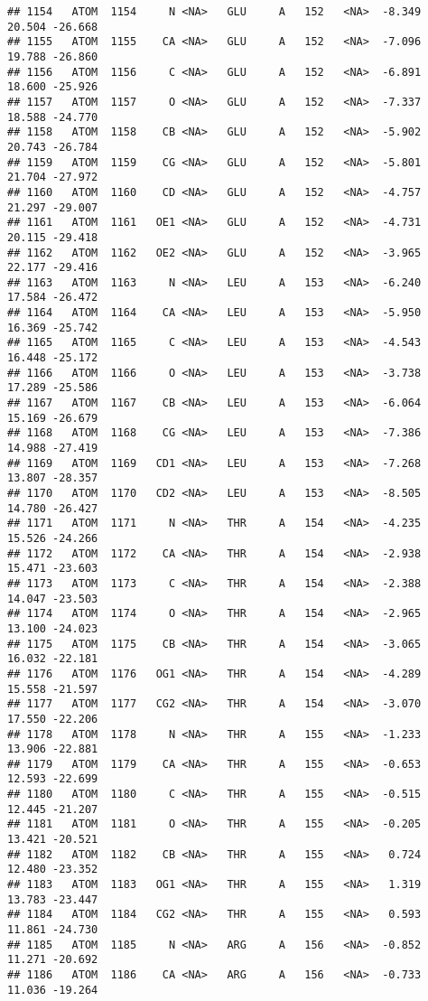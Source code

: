 \documentclass[
]{article}
\begin{document}
\begin{verbatim}
## 1154   ATOM  1154     N <NA>   GLU     A   152   <NA>  -8.349  20.504 -26.668
## 1155   ATOM  1155    CA <NA>   GLU     A   152   <NA>  -7.096  19.788 -26.860
## 1156   ATOM  1156     C <NA>   GLU     A   152   <NA>  -6.891  18.600 -25.926
## 1157   ATOM  1157     O <NA>   GLU     A   152   <NA>  -7.337  18.588 -24.770
## 1158   ATOM  1158    CB <NA>   GLU     A   152   <NA>  -5.902  20.743 -26.784
## 1159   ATOM  1159    CG <NA>   GLU     A   152   <NA>  -5.801  21.704 -27.972
## 1160   ATOM  1160    CD <NA>   GLU     A   152   <NA>  -4.757  21.297 -29.007
## 1161   ATOM  1161   OE1 <NA>   GLU     A   152   <NA>  -4.731  20.115 -29.418
## 1162   ATOM  1162   OE2 <NA>   GLU     A   152   <NA>  -3.965  22.177 -29.416
## 1163   ATOM  1163     N <NA>   LEU     A   153   <NA>  -6.240  17.584 -26.472
## 1164   ATOM  1164    CA <NA>   LEU     A   153   <NA>  -5.950  16.369 -25.742
## 1165   ATOM  1165     C <NA>   LEU     A   153   <NA>  -4.543  16.448 -25.172
## 1166   ATOM  1166     O <NA>   LEU     A   153   <NA>  -3.738  17.289 -25.586
## 1167   ATOM  1167    CB <NA>   LEU     A   153   <NA>  -6.064  15.169 -26.679
## 1168   ATOM  1168    CG <NA>   LEU     A   153   <NA>  -7.386  14.988 -27.419
## 1169   ATOM  1169   CD1 <NA>   LEU     A   153   <NA>  -7.268  13.807 -28.357
## 1170   ATOM  1170   CD2 <NA>   LEU     A   153   <NA>  -8.505  14.780 -26.427
## 1171   ATOM  1171     N <NA>   THR     A   154   <NA>  -4.235  15.526 -24.266
## 1172   ATOM  1172    CA <NA>   THR     A   154   <NA>  -2.938  15.471 -23.603
## 1173   ATOM  1173     C <NA>   THR     A   154   <NA>  -2.388  14.047 -23.503
## 1174   ATOM  1174     O <NA>   THR     A   154   <NA>  -2.965  13.100 -24.023
## 1175   ATOM  1175    CB <NA>   THR     A   154   <NA>  -3.065  16.032 -22.181
## 1176   ATOM  1176   OG1 <NA>   THR     A   154   <NA>  -4.289  15.558 -21.597
## 1177   ATOM  1177   CG2 <NA>   THR     A   154   <NA>  -3.070  17.550 -22.206
## 1178   ATOM  1178     N <NA>   THR     A   155   <NA>  -1.233  13.906 -22.881
## 1179   ATOM  1179    CA <NA>   THR     A   155   <NA>  -0.653  12.593 -22.699
## 1180   ATOM  1180     C <NA>   THR     A   155   <NA>  -0.515  12.445 -21.207
## 1181   ATOM  1181     O <NA>   THR     A   155   <NA>  -0.205  13.421 -20.521
## 1182   ATOM  1182    CB <NA>   THR     A   155   <NA>   0.724  12.480 -23.352
## 1183   ATOM  1183   OG1 <NA>   THR     A   155   <NA>   1.319  13.783 -23.447
## 1184   ATOM  1184   CG2 <NA>   THR     A   155   <NA>   0.593  11.861 -24.730
## 1185   ATOM  1185     N <NA>   ARG     A   156   <NA>  -0.852  11.271 -20.692
## 1186   ATOM  1186    CA <NA>   ARG     A   156   <NA>  -0.733  11.036 -19.264

\end{verbatim}
\end{document}
